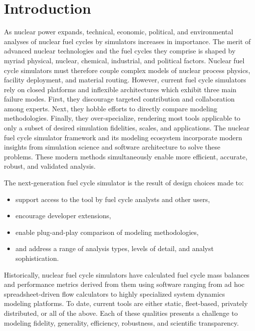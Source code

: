 
\section{Introduction}



As nuclear power expands, technical, economic, political, and environmental analyses of nuclear fuel
cycles by simulators increases in importance. The merit of advanced nuclear technologies and the fuel cycles they comprise is shaped by myriad physical, nuclear, chemical, industrial, and political factors. Nuclear fuel cycle simulators must therefore couple complex models of
nuclear process physics, facility deployment, and material routing.
However, current fuel cycle simulators rely on closed platforms and inflexible
architectures which exhibit three main failure modes. First, they discourage
targeted contribution and collaboration among experts. Next, they hobble
efforts to directly compare modeling methodologies. Finally, they
over-specialize, rendering most tools applicable to only a subset of
desired simulation fidelities, scales, and applications.
The \Cyclus nuclear fuel cycle simulator framework and
its modeling ecosystem incorporate modern insights from
simulation science and software architecture to solve these problems.
These modern methods simultaneously enable more efficient, accurate,
robust, and validated analysis.

The \Cyclus next-generation fuel cycle simulator is the result of design
choices made to:
\begin{itemize}
\item support access to the tool by fuel cycle analysts and other users,
\item encourage developer extensions,
\item enable plug-and-play comparison of modeling methodologies,
\item and address a range of analysis types, levels of detail, and analyst sophistication.
\end{itemize}
Historically, nuclear fuel cycle simulators have calculated
fuel cycle mass balances and performance metrics derived from them using software
ranging from ad hoc spreadsheet-driven flow calculators to highly specialized
system dynamics modeling platforms. To date, current tools are either static, fleet-based,
privately distributed, or all of the above. Each of these qualities presents a
challenge to modeling fidelity, generality, efficiency, robustness, and
scientific transparency.

